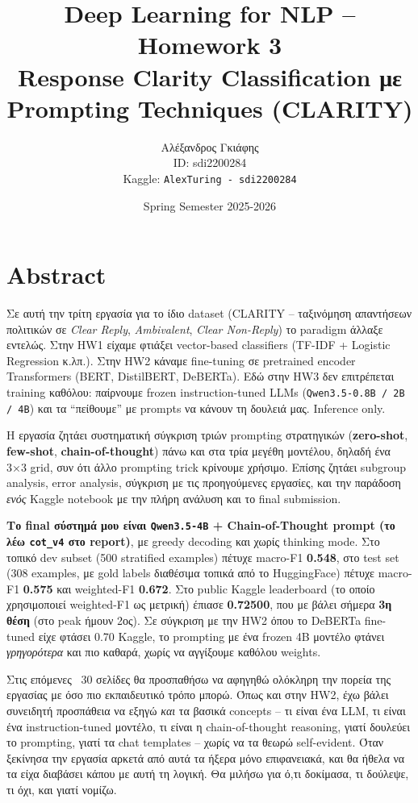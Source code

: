 \documentclass[12pt]{fphw}
\title{Deep Learning for NLP -- Homework 3 \\ Response Clarity Classification με Prompting Techniques (CLARITY)}
\author{Αλέξανδρος Γκιάφης \\ ID: sdi2200284 \\ Kaggle: \texttt{AlexTuring - sdi2200284}}
\date{Spring Semester 2025-2026}
\institute{National and Kapodistrian University of Athens \\ Department of Informatics and Telecommunications}
\begin{document}
\maketitle

{
  \hypersetup{linkcolor=black}
  \tableofcontents
}
\newpage

\section{Abstract}

Σε αυτή την τρίτη εργασία για το ίδιο dataset (CLARITY -- ταξινόμηση απαντήσεων πολιτικών σε \emph{Clear Reply}, \emph{Ambivalent}, \emph{Clear Non-Reply}) το paradigm άλλαξε εντελώς. Στην HW1 είχαμε φτιάξει vector-based classifiers (TF-IDF + Logistic Regression κ.λπ.). Στην HW2 κάναμε fine-tuning σε pretrained encoder Transformers (BERT, DistilBERT, DeBERTa). Εδώ στην HW3 δεν επιτρέπεται training καθόλου: παίρνουμε frozen instruction-tuned LLMs (\texttt{Qwen3.5-0.8B / 2B / 4B}) και τα ``πείθουμε'' με prompts να κάνουν τη δουλειά μας. Inference only.

Η εργασία ζητάει συστηματική σύγκριση τριών prompting στρατηγικών (\textbf{zero-shot}, \textbf{few-shot}, \textbf{chain-of-thought}) πάνω και στα τρία μεγέθη μοντέλου, δηλαδή ένα 3×3 grid, συν ότι άλλο prompting trick κρίνουμε χρήσιμο. Επίσης ζητάει subgroup analysis, error analysis, σύγκριση με τις προηγούμενες εργασίες, και την παράδοση \emph{ενός} Kaggle notebook με την πλήρη ανάλυση και το final submission.

\textbf{Το final σύστημά μου είναι \texttt{Qwen3.5-4B} + Chain-of-Thought prompt (το λέω \texttt{cot\_v4} στο report)}, με greedy decoding και χωρίς thinking mode. Στο τοπικό dev subset (500 stratified examples) πέτυχε macro-F1 \textbf{0.548}, στο test set (308 examples, με gold labels διαθέσιμα τοπικά από το HuggingFace) πέτυχε macro-F1 \textbf{0.575} και weighted-F1 \textbf{0.672}. Στο public Kaggle leaderboard (το οποίο χρησιμοποιεί weighted-F1 ως μετρική) έπιασε \textbf{0.72500}, που με βάλει σήμερα \textbf{3η θέση} (στο peak ήμουν 2ος). Σε σύγκριση με την HW2 όπου το DeBERTa fine-tuned είχε φτάσει 0.70 Kaggle, το prompting με ένα frozen 4B μοντέλο φτάνει \emph{γρηγορότερα} και πιο καθαρά, χωρίς να αγγίξουμε καθόλου weights.

Στις επόμενες ~30 σελίδες θα προσπαθήσω να αφηγηθώ ολόκληρη την πορεία της εργασίας με όσο πιο εκπαιδευτικό τρόπο μπορώ. Όπως και στην HW2, έχω βάλει συνειδητή προσπάθεια να εξηγώ \emph{και} τα βασικά concepts -- τι είναι ένα LLM, τι είναι ένα instruction-tuned μοντέλο, τι είναι η chain-of-thought reasoning, γιατί δουλεύει το prompting, γιατί τα chat templates -- χωρίς να τα θεωρώ self-evident. Όταν ξεκίνησα την εργασία αρκετά από αυτά τα ήξερα μόνο επιφανειακά, και θα ήθελα να τα είχα διαβάσει κάπου με αυτή τη λογική. Θα μιλήσω για ό,τι δοκίμασα, τι δούλεψε, τι όχι, και γιατί νομίζω.
\end{document}
